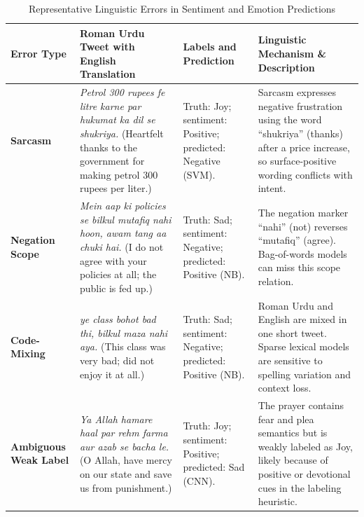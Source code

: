 \begin{table}[t]
\caption{Representative Linguistic Errors in Sentiment and Emotion Predictions}
\label{tab:error-analysis}
\centering
\footnotesize
\setlength{\tabcolsep}{4pt}
\renewcommand{\arraystretch}{1.15}
\begin{tabularx}{\textwidth}{p{}X p{} p{}}
\toprule
Error Type & Roman Urdu Tweet with English Translation & Labels and Prediction & Linguistic Mechanism \& Description \\
\midrule
\textbf{Sarcasm} & \emph{Petrol 300 rupees fe litre karne par hukumat ka dil se shukriya.} (Heartfelt thanks to the government for making petrol 300 rupees per liter.) & Truth: Joy; sentiment: Positive; predicted: Negative (SVM). & Sarcasm expresses negative frustration using the word ``shukriya'' (thanks) after a price increase, so surface-positive wording conflicts with intent. \\
\midrule
\textbf{Negation Scope} & \emph{Mein aap ki policies se bilkul mutafiq nahi hoon, awam tang aa chuki hai.} (I do not agree with your policies at all; the public is fed up.) & Truth: Sad; sentiment: Negative; predicted: Positive (NB). & The negation marker ``nahi'' (not) reverses ``mutafiq'' (agree). Bag-of-words models can miss this scope relation. \\
\midrule
\textbf{Code-Mixing} & \emph{ye class bohot bad thi, bilkul maza nahi aya.} (This class was very bad; did not enjoy it at all.) & Truth: Sad; sentiment: Negative; predicted: Positive (NB). & Roman Urdu and English are mixed in one short tweet. Sparse lexical models are sensitive to spelling variation and context loss. \\
\midrule
\textbf{Ambiguous Weak Label} & \emph{Ya Allah hamare haal par rehm farma aur azab se bacha le.} (O Allah, have mercy on our state and save us from punishment.) & Truth: Joy; sentiment: Positive; predicted: Sad (CNN). & The prayer contains fear and plea semantics but is weakly labeled as Joy, likely because of positive or devotional cues in the labeling heuristic. \\
\bottomrule
\end{tabularx}
\renewcommand{\arraystretch}{1.0}
\end{table}
